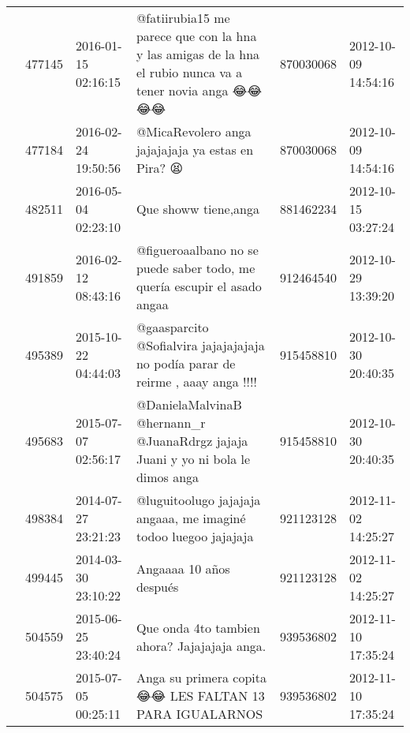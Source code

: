 \begin{tabular}{llllrl}
           & 477145  & 2016-01-15 02:16:15 &                                      @fatiirubia15 me parece que con la hna y las amigas de la hna el rubio nunca va a tener novia anga 😂😂😂😂 &   870030068 & 2012-10-09 14:54:16 \\
           & 477184  & 2016-02-24 19:50:56 &                                                                                            @MicaRevolero anga jajajajaja ya estas en Pira? 😫 &   870030068 & 2012-10-09 14:54:16 \\
           & 482511  & 2016-05-04 02:23:10 &                                                                                                                         Que showw tiene,anga &   881462234 & 2012-10-15 03:27:24 \\
           & 491859  & 2016-02-12 08:43:16 &                                                                     @figueroaalbano no se puede saber todo, me quería escupir el asado angaa &   912464540 & 2012-10-29 13:39:20 \\
           & 495389  & 2015-10-22 04:44:03 &                                                              @gaasparcito @Sofialvira jajajajajaja no podía parar de reirme , aaay anga !!!! &   915458810 & 2012-10-30 20:40:35 \\
           & 495683  & 2015-07-07 02:56:17 &                                                              @DanielaMalvinaB @hernann\_r @JuanaRdrgz jajaja Juani y yo ni bola le dimos anga &   915458810 & 2012-10-30 20:40:35 \\
           & 498384  & 2014-07-27 23:21:23 &                                                                              @luguitoolugo jajajaja angaaa, me imaginé todoo luegoo jajajaja &   921123128 & 2012-11-02 14:25:27 \\
           & 499445  & 2014-03-30 23:10:22 &                                                                                                                      Angaaaa 10 años después &   921123128 & 2012-11-02 14:25:27 \\
           & 504559  & 2015-06-25 23:40:24 &                                                                                                Que onda 4to tambien ahora?  Jajajajaja anga. &   939536802 & 2012-11-10 17:35:24 \\
           & 504575  & 2015-07-05 00:25:11 &                                                                                      Anga su primera copita 😂😂 LES FALTAN 13 PARA IGUALARNOS &   939536802 & 2012-11-10 17:35:24 \\

\end{tabular}
